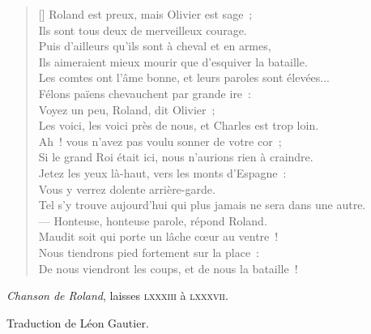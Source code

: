 \documentclass[a4paper,14pt,french]{extarticle}
\begin{document}
\begin{verse}[\versewidth]
Roland est preux, mais Olivier est sage ;\\
Ils sont tous deux de merveilleux courage.\\
Puis d’ailleurs qu’ils sont à cheval et en armes,\\
Ils aimeraient mieux mourir que d’esquiver la bataille.\\
Les comtes ont l’âme bonne, et leurs paroles sont élevées...\\
Félons païens chevauchent par grande ire :\\
Voyez un peu, Roland, dit Olivier ;\\
Les voici, les voici près de nous, et Charles est trop loin.\\
Ah ! vous n’avez pas voulu sonner de votre cor ;\\
Si le grand Roi était ici, nous n’aurions rien à craindre.\\
Jetez les yeux là-haut, vers les monts d’Espagne :\\
Vous y verrez dolente arrière-garde.\\
Tel s’y trouve aujourd’hui qui plus jamais ne sera dans une autre.\\
— Honteuse, honteuse parole, répond Roland.\\
Maudit soit qui porte un lâche cœur au ventre !\\
Nous tiendrons pied fortement sur la place :\\
De nous viendront les coups, et de nous la bataille !
\end{verse}

\begin{flushright}
\large
\textit{Chanson de Roland}, laisses \textsc{lxxxiii} à \textsc{lxxxvii}.

\medskip
\small
Traduction de Léon Gautier.
\end{flushright}
\end{document}
